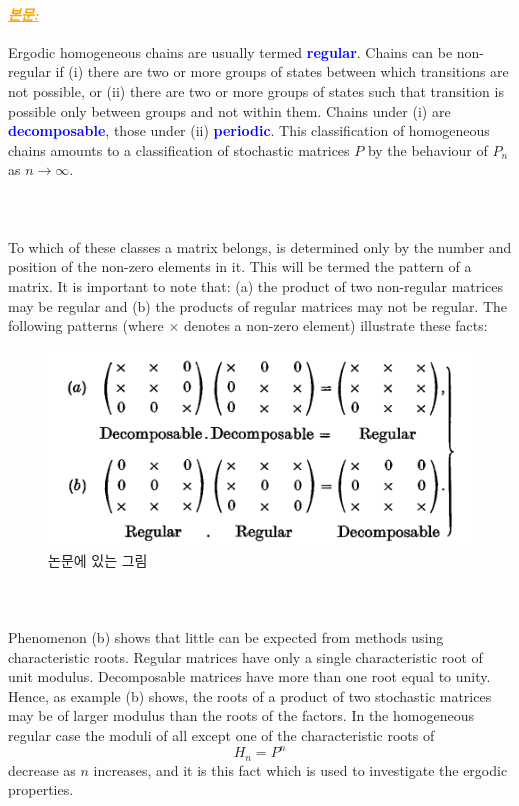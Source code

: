 \documentclass[12pt,oneside,english,a4paper]{article}
\def\bk{\paragraph{\LARGE$$}\LARGE}
\newcommand{\paraorange}[1]{\paragraph{\LARGE\textcolor{orange}{\it\underline{\textbf{#1:}}}}\LARGE}
\begin{document}
\paraorange{본문} Ergodic homogeneous chains are usually termed
\textcolor{blue}{\bf regular}. Chains can be non-regular if (i) there are two or more groups of states between which transitions are not possible, or (ii) there are two or more groups of states such that transition is possible only between groups and not within them. Chains under (i) are \textcolor{blue}{\bf decomposable}, those under (ii) \textcolor{blue}{\bf periodic}. This classification of homogeneous chains amounts to a classification of stochastic matrices $P$ by the behaviour of $P_n$ as $n\to \infty$.
\bk To which of these classes a matrix belongs, is determined only by the number and position of the non-zero elements in it. This will be termed the pattern of a matrix. It is important to note that: (a) the product of two non-regular matrices may be regular and (b) the products of regular matrices may not be regular. The following patterns
(where $\times$ denotes a non-zero element) illustrate these facts:
\begin{figure}[h]
\center
\includegraphics[width=1\textwidth]{Fig1.png}
\caption{논문에 있는 그림}
\end{figure}
\bk Phenomenon (b) shows that little can be expected from methods using characteristic roots. Regular matrices have only a single characteristic root of unit modulus. Decomposable matrices have more than one root equal to unity. Hence, as example (b) shows, the roots of a product of two stochastic matrices may be of larger modulus
than the roots of the factors. In the homogeneous regular case the moduli of all except one of the characteristic roots of
\[
H_n=P^n
\]
decrease as $n$ increases, and it is this fact which is used to investigate the ergodic properties. 
\end{document}
